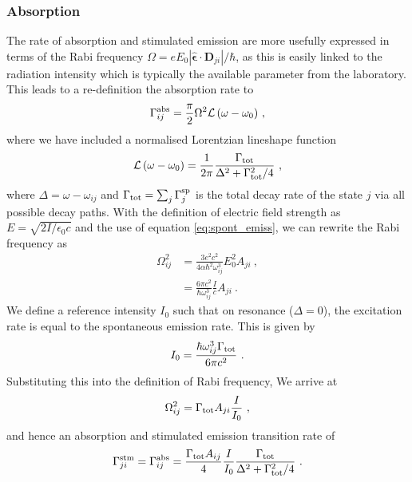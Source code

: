 \documentclass{article}
\begin{document}
\subsubsection{Absorption}
The rate of absorption and stimulated emission are more usefully expressed in terms of the Rabi frequency $\Omega = e E_0\left|\boldsymbol{\hat{\epsilon}}\cdot\mathbf{D}_{ji}\right|/\hbar$, as this is easily linked to the radiation intensity which is typically the available parameter from the laboratory. This leads to a re-definition the absorption rate to  
\begin{equation}
     \Gamma^{\rm{abs}}_{ij} = \frac{\pi}{2}\Omega^2 {\mathcal{L}\left(\omega-\omega_0\right)}~,
\end{equation}
where we have included a normalised Lorentzian lineshape function 
\begin{equation}
     {\mathcal{L}\left(\omega-\omega_0\right)} = \frac{1}{2\pi}\frac{\Gamma_{\rm{tot}}}{\Delta^2 + \Gamma_{\rm{tot}}^2/4}~,
\end{equation}
where $\Delta = \omega - \omega_{ij}$ and $\Gamma_{\rm{tot}} = \sum_{j} \Gamma^{\rm{sp}}_{j}$ is the total decay rate of the state $j$ via all possible decay paths. With the definition of electric field strength as ${E=\sqrt{2I/\epsilon_0 c}}$ and the use of equation \ref{eq:spont_emiss}, we can rewrite the Rabi frequency as 
\begin{align}
    \Omega_{ij}^2 &= \frac{3 e^2c^2}{4\alpha \hbar^2\omega_{ij}^3}E_0^2A_{ji}~, \\ &= \frac{6\pi c^2}{\hbar\omega_{ij}^3} \frac{I}{c} A_{ji}~.
\end{align}
We define a reference intensity $I_0$ such that on resonance ($\Delta = 0$), the excitation rate is equal to the spontaneous emission rate. This is given by
\begin{equation}
    I_0 = \frac{\hbar \omega_{ij}^3 \Gamma_{\rm{tot}}}{6\pi c^2}~.
\end{equation}
Substituting this into the definition of Rabi frequency, We arrive at 
\begin{equation}
    \Omega_{ij}^2 = \Gamma_{\rm{tot}} A_{ji}\frac{I}{I_0}~,
\end{equation}
and hence an absorption and stimulated emission transition rate of
\begin{equation}
    \Gamma^{\rm{stm}}_{ji} = \Gamma^{\rm{abs}}_{ij} = \frac{\Gamma_{\rm{tot}} A_{ij}}{4} \frac{I}{I_0} \frac{\Gamma_{\rm{tot}}}{\Delta^2 + \Gamma_{\rm{tot}}^2/4}~.
\end{equation}
\end{document}
